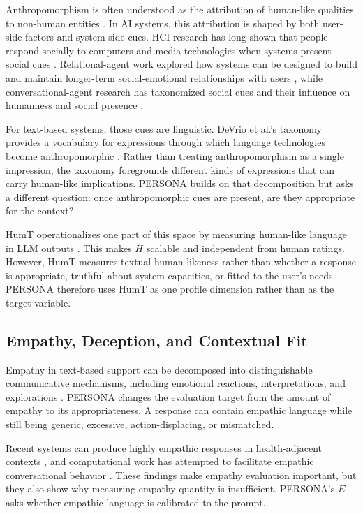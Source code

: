 \documentclass[manuscript,review,anonymous]{acmart}
\begin{document}
Anthropomorphism is often understood as the attribution of human-like qualities to non-human entities \cite{epley2007,waytz2010,epley2008}. In AI systems, this attribution is shaped by both user-side factors and system-side cues. HCI research has long shown that people respond socially to computers and media technologies when systems present social cues \cite{nass1994,reeves1996,nass2000}. Relational-agent work explored how systems can be designed to build and maintain longer-term social-emotional relationships with users \cite{bickmore2005}, while conversational-agent research has taxonomized social cues and their influence on humanness and social presence \cite{feine2019,araujo2018,go2019}.

For text-based systems, those cues are linguistic. DeVrio et al.'s taxonomy provides a vocabulary for expressions through which language technologies become anthropomorphic \cite{devrio2025}. Rather than treating anthropomorphism as a single impression, the taxonomy foregrounds different kinds of expressions that can carry human-like implications. PERSONA builds on that decomposition but asks a different question: once anthropomorphic cues are present, are they appropriate for the context?

HumT operationalizes one part of this space by measuring human-like language in LLM outputs \cite{cheng2025}. This makes $H$ scalable and independent from human ratings. However, HumT measures textual human-likeness rather than whether a response is appropriate, truthful about system capacities, or fitted to the user's needs. PERSONA therefore uses HumT as one profile dimension rather than as the target variable.

\subsection{Empathy, Deception, and Contextual Fit}

Empathy in text-based support can be decomposed into distinguishable communicative mechanisms, including emotional reactions, interpretations, and explorations \cite{sharma2020}. PERSONA changes the evaluation target from the amount of empathy to its appropriateness. A response can contain empathic language while still being generic, excessive, action-displacing, or mismatched.

Recent systems can produce highly empathic responses in health-adjacent contexts \cite{ayers2023}, and computational work has attempted to facilitate empathic conversational behavior \cite{sharma2021}. These findings make empathy evaluation important, but they also show why measuring empathy quantity is insufficient. PERSONA's $E$ asks whether empathic language is calibrated to the prompt.
\end{document}
